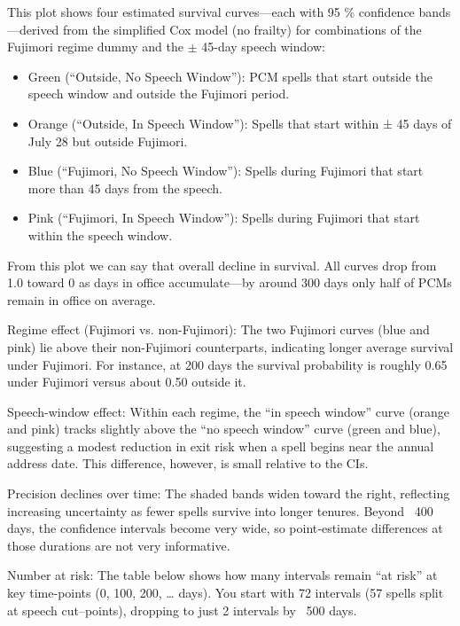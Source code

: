 \documentclass[a4paper, 12pt]{article}
\begin{document}
This plot shows four estimated survival curves—each with 95 \% confidence bands—derived from the simplified Cox model (no frailty) for combinations of the Fujimori regime dummy and the $\pm$ 45-day speech window:

\begin{itemize}
\item Green (“Outside, No Speech Window”): PCM spells that start outside the speech window and outside the Fujimori period.

\item Orange (“Outside, In Speech Window”): Spells that start within ± 45 days of July 28 but outside Fujimori.

\item Blue (“Fujimori, No Speech Window”): Spells during Fujimori that start more than 45 days from the speech.

\item Pink (“Fujimori, In Speech Window”): Spells during Fujimori that start within the speech window.
\end{itemize}

From this plot we can say that overall decline in survival. All curves drop from 1.0 toward 0 as days in office accumulate—by around 300 days only half of PCMs remain in office on average.

Regime effect (Fujimori vs. non-Fujimori): The two Fujimori curves (blue and pink) lie above their non-Fujimori counterparts, indicating longer average survival under Fujimori. For instance, at 200 days the survival probability is roughly 0.65 under Fujimori versus about 0.50 outside it.

Speech-window effect: Within each regime, the “in speech window” curve (orange and pink) tracks slightly above the “no speech window” curve (green and blue), suggesting a modest reduction in exit risk when a spell begins near the annual address date. This difference, however, is small relative to the CIs.

Precision declines over time: The shaded bands widen toward the right, reflecting increasing uncertainty as fewer spells survive into longer tenures. Beyond ~400 days, the confidence intervals become very wide, so point‐estimate differences at those durations are not very informative.

Number at risk: The table below shows how many intervals remain “at risk” at key time-points (0, 100, 200, … days). You start with 72 intervals (57 spells split at speech cut–points), dropping to just 2 intervals by ~500 days.
\end{document}
